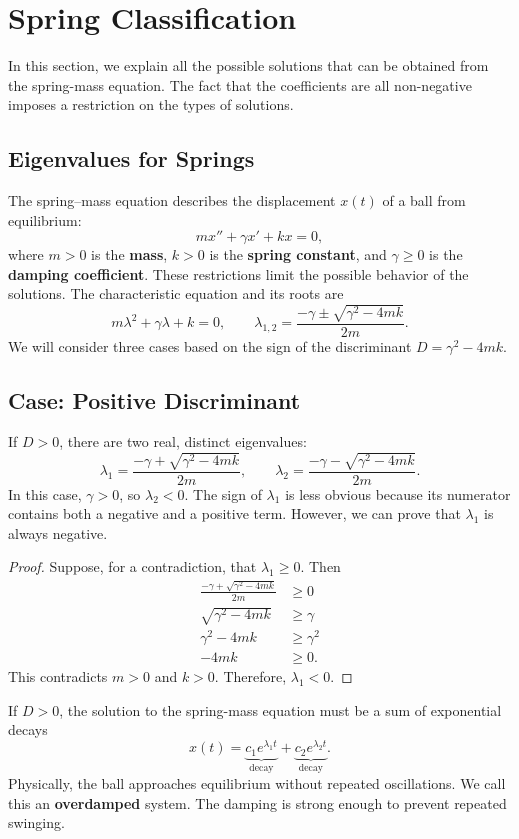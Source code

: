 \documentclass[10pt,letterpaper]{article}
\begin{document}

\section{Spring Classification}

In this section, we explain all the possible solutions that can be obtained from the spring-mass equation. The fact that the coefficients are all non-negative imposes a restriction on the types of solutions.

\subsection{Eigenvalues for Springs}
The spring--mass equation describes the displacement $x(t)$
of a ball from equilibrium:
\[
mx''+\gamma x'+kx=0,
\]
where $m>0$ is the \textbf{mass}, $k>0$ is the
\textbf{spring constant}, and $\gamma\ge0$ is the
\textbf{damping coefficient}. These restrictions limit the
possible behavior of the solutions. The characteristic equation and its roots are
\[
m\lambda^2+\gamma\lambda+k=0,
\qquad
\lambda_{1,2}
=\frac{-\gamma\pm\sqrt{\gamma^2-4mk}}{2m}.
\]
We will consider three cases based on the sign of the
discriminant $D=\gamma^2-4mk$.



\subsection{Case: Positive Discriminant}
If $D>0$, there are two real, distinct eigenvalues:
\[
\lambda_1=\frac{-\gamma+\sqrt{\gamma^2-4mk}}{2m},
\qquad
\lambda_2=\frac{-\gamma-\sqrt{\gamma^2-4mk}}{2m}.
\]
In this case, $\gamma>0$, so $\lambda_2<0$.
The sign of $\lambda_1$ is less obvious because its numerator
contains both a negative and a positive term. However, we can prove that $\lambda_1$ is always negative.

\begin{proof}
Suppose, for a contradiction, that $\lambda_1\ge0$. Then
\begin{align*}
\frac{-\gamma+\sqrt{\gamma^2-4mk}}{2m}&\ge0\\
\sqrt{\gamma^2-4mk}&\ge\gamma\\
\gamma^2-4mk&\ge\gamma^2\\
-4mk&\ge0.
\end{align*}
This contradicts $m>0$ and $k>0$. Therefore, $\lambda_1<0$.
\end{proof}
If $D>0$, the solution to the spring-mass equation must be a sum of exponential decays
\[
x(t)=
\underbrace{c_1e^{\lambda_1t}}_{\text{decay}}
+\underbrace{c_2e^{\lambda_2t}}_{\text{decay}}.
\]
Physically, the ball approaches equilibrium without repeated
oscillations. We call this an \textbf{overdamped} system.
The damping is strong enough to prevent repeated swinging.
\end{document}
